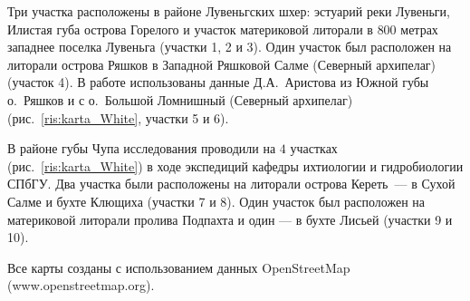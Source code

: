 Три участка расположены в районе Лувеньгских шхер: эстуарий реки Лувеньги, Илистая губа острова Горелого и участок материковой литорали в $800$ метрах западнее поселка Лувеньга (участки 1, 2 и 3).
Один участок был расположен на литорали острова Ряшков в Западной Ряшковой Салме (Северный архипелаг) (участок 4).
В работе использованы данные Д.\:А.~Аристова из Южной губы о.~Ряшков и с о.~Большой Ломнишный (Северный архипелаг) (рис.~\ref{ris:karta_White}, участки 5 и 6). 

В районе губы Чупа исследования проводили на $4$ участках (рис.~\ref{ris:karta_White}) в ходе экспедиций кафедры ихтиологии и гидробиологии СПбГУ. 
Два участка были расположены на литорали острова Кереть~--- в Сухой Салме и бухте Клющиха (участки 7 и 8). 
Один участок был расположен на материковой литорали пролива Подпахта и один --- в бухте Лисьей (участки 9 и 10).


Все карты созданы с использованием данных OpenStreetMap (www.openstreetmap.org).
\afterpage{\clearpage}

